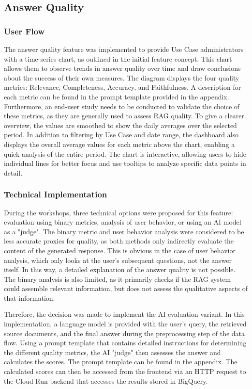 \documentclass[
	english,
	ruledheaders=section,%
	class=report,%
	thesis={type=bachelor},%
	accentcolor=1b,%
	custommargins=true,%
	marginpar=false,%
	parskip=half-,%
	fontsize=11pt,%
	DIV=14,
]{tudapub}
\begin{document}
\subsection{Answer Quality}
\subsubsection{User Flow}
The answer quality feature was implemented to provide Use Case administrators with a time-series chart, as outlined in the initial feature concept. This chart allows them to observe trends in answer quality over time and draw conclusions about the success of their own measures. The diagram displays the four quality metrics: Relevance, Completeness, Accuracy, and Faithfulness. A description for each metric can be found in the prompt template provided in the appendix. Furthermore, an end-user study needs to be conducted to validate the choice of these metrics, as they are generally used to assess RAG quality. To give a clearer overview, the values are smoothed to show the daily averages over the selected period. In addition to filtering by Use Case and date range, the dashboard also displays the overall average values for each metric above the chart, enabling a quick analysis of the entire period. The chart is interactive, allowing users to hide individual lines for better focus and use tooltips to analyze specific data points in detail.

\subsubsection{Technical Implementation}
During the workshops, three technical options were proposed for this feature: evaluation using binary metrics, analysis of user behavior, or using an AI model as a "judge". The binary metric and user behavior analysis were considered to be less accurate proxies for quality, as both methods only indirectly evaluate the content of the generated response. This is obvious in the case of user behavior analysis, which only looks at the user's subsequent questions, not the answer itself. In this way, a detailed explanation of the answer quality is not possible. The binary analysis is also limited, as it primarily checks if the RAG system could assemble relevant information, but does not assess the qualitative aspects of that information.

Therefore, the decision was made to implement the AI evaluation variant. In this implementation, a language model is provided with the user's query, the retrieved source documents, and the final answer during the preprocessing step of the data flow. Using a prompt template that contains detailed instructions for determining the different quality metrics, the AI "judge" then assesses the answer and calculates the scores. The prompt template can be found in the appendix. The calculated scores can then be accessed from the frontend via an HTTP request to the Cloud Run backend that accesses the results stored in BigQuery.
\end{document}
